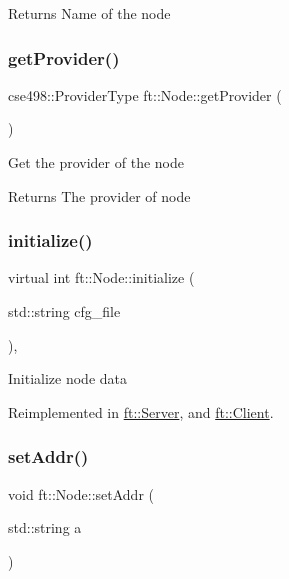 \begin{DoxyReturn}{Returns}
Name of the node 
\end{DoxyReturn}
\mbox{\label{classft_1_1Node_ae6115aceb38ad07ba4afd6fa7cd7f9aa}} 
\subsubsection{\texorpdfstring{get\+Provider()}{getProvider()}}
{\footnotesize\ttfamily cse498\+::\+Provider\+Type ft\+::\+Node\+::get\+Provider (\begin{DoxyParamCaption}{ }\end{DoxyParamCaption})\hspace{0.3cm}{\ttfamily [inline]}}

Get the provider of the node

\begin{DoxyReturn}{Returns}
The provider of node 
\end{DoxyReturn}
\mbox{\label{classft_1_1Node_addc92fd2c5cae12a8ea68c30b7202e91}} 
\subsubsection{\texorpdfstring{initialize()}{initialize()}}
{\footnotesize\ttfamily virtual int ft\+::\+Node\+::initialize (\begin{DoxyParamCaption}\item[{std\+::string}]{cfg\+\_\+file }\end{DoxyParamCaption})\hspace{0.3cm}{\ttfamily [inline]}, {\ttfamily [virtual]}}

Initialize node data 

Reimplemented in \mbox{\hyperlink{classft_1_1Server_a834002a833999b593d357b72ef69ddcf}{ft\+::\+Server}}, and \mbox{\hyperlink{classft_1_1Client_a063db70469c9f2715bbad637d0353680}{ft\+::\+Client}}.

\mbox{\label{classft_1_1Node_af2fde6292b45c9a7e85a8905c8c728cc}} 
\subsubsection{\texorpdfstring{set\+Addr()}{setAddr()}}
{\footnotesize\ttfamily void ft\+::\+Node\+::set\+Addr (\begin{DoxyParamCaption}\item[{std\+::string}]{a }\end{DoxyParamCaption})\hspace{0.3cm}{\ttfamily [inline]}}

